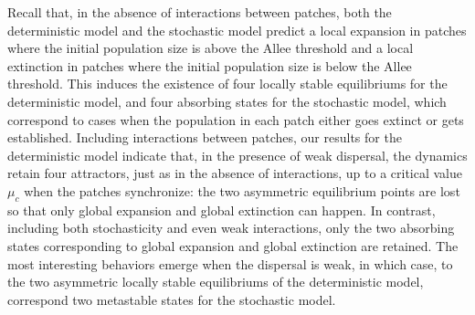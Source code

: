 \noindent Recall that, in the absence of interactions between patches, both the deterministic model and the stochastic
 model predict a local expansion in patches where the initial population size is above the Allee threshold and a local extinction
 in patches where the initial population size is below the Allee threshold.
 This induces the existence of four locally stable equilibriums for the deterministic model, and four absorbing states for the
 stochastic model, which correspond to cases when the population in each patch either goes extinct or gets established.
 Including interactions between patches, our results for the deterministic model indicate that, in the presence of weak dispersal,
 the dynamics retain four attractors, just as in the absence of interactions, up to a critical value $\mu_c$ when the patches
 synchronize: the two asymmetric equilibrium points are lost so that only global expansion and global extinction can happen.
 In contrast, including both stochasticity and even weak interactions, only the two absorbing states corresponding to global
 expansion and global extinction are retained.
 The most interesting behaviors emerge when the dispersal is weak, in which case, to the two asymmetric locally stable equilibriums
 of the deterministic model, correspond two metastable states for the stochastic model.

